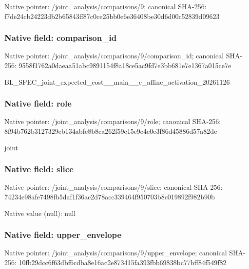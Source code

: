 \documentclass[10pt,a4paper]{article}
\begin{document}
Native pointer: /joint\_analysis/comparisons/9; canonical SHA-256: f7de24cb24223db2b65843ff\allowbreak{}87c0ce25bb0e6e36408be30d\allowbreak{}6d00c52839d09623



\subsubsection{Native field: comparison\_id}


Native pointer: /joint\_analysis/comparis\allowbreak{}ons/9/comparison\_id; canonical SHA-256: 9558f1762a0daeaa51abc989\allowbreak{}1154f8a18ce5ac9fd7e3bb68\allowbreak{}1e7e1367a015ce7e


BL\_SPEC\_joint\_expected\_c\allowbreak{}ost\_\_main\_\_c\_affine\_acti\allowbreak{}vation\_20261126


\subsubsection{Native field: role}


Native pointer: /joint\_analysis/comparisons/9/role; canonical SHA-256: 8f94b762b3127329eb134abf\allowbreak{}e8b8ca262f59c15e9c4e0e3f\allowbreak{}86d45886d57a82de


joint


\subsubsection{Native field: slice}


Native pointer: /joint\_analysis/comparisons/9/slice; canonical SHA-256: 74234e98afe7498fb5daf1f3\allowbreak{}6ac2d78acc339464f950703b\allowbreak{}8c019892f982b90b



Native value (null): null



\subsubsection{Native field: upper\_envelope}


Native pointer: /joint\_analysis/comparis\allowbreak{}ons/9/upper\_envelope; canonical SHA-256: 10fb29dcc6f63dbf6cdba8e1\allowbreak{}6ac2e873415fa393fbb69838\allowbreak{}bc77bff84f549f82
\end{document}
